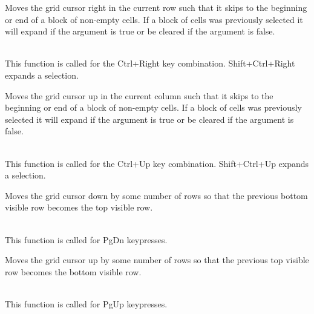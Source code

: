 Moves the grid cursor right in the current row such that it skips to the beginning or
end of a block of non-empty cells. If a block of cells was previously selected it
will expand if the argument is true or be cleared if the argument is false.

\\
This function is called for the Ctrl+Right key combination. Shift+Ctrl+Right expands a selection.



\label{wxgridmovecursorupblock}


Moves the grid cursor up in the current column such that it skips to the beginning or
end of a block of non-empty cells. If a block of cells was previously selected it
will expand if the argument is true or be cleared if the argument is false.

\\
This function is called for the Ctrl+Up key combination. Shift+Ctrl+Up expands a selection.



\label{wxgridmovepagedown}


Moves the grid cursor down by some number of rows so that the previous bottom visible row
becomes the top visible row.

\\
This function is called for PgDn keypresses.



\label{wxgridmovepageup}


Moves the grid cursor up by some number of rows so that the previous top visible row
becomes the bottom visible row.

\\
This function is called for PgUp keypresses.



\label{wxgridregisterdatatype}



